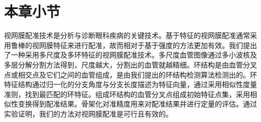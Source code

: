 \section{本章小节}
\label{}

视网膜配准技术是分析与诊断眼科疾病的关键技术。基于特征的视网膜配准通常采用鲁棒的视网膜特征来进行配准，故而相对于基于强度的方法更加有效。我们提出了一种采用多尺度及多环特征的视网膜配准技术。多尺度血管图像通过多小波核及多层分解分割方法得到，尺度越大，分割出的血管就越精细。环结构是由血管分叉点或相交点及它们之间的血管组成，是由我们提出的环结构检测算法检测出的。环特征结构通过归一化的分支角度与分支长度描述为特征向量，通过采用相似性度量准则，找到最匹配的环特征。组成环结构的血管分叉点组成初始特征点集，采用相似性变换得到配准结果。骨架化对准精度用来对配准结果并进行定量的评估。通过实验证明，我们的方法对视网膜配准是可行且有效的。
